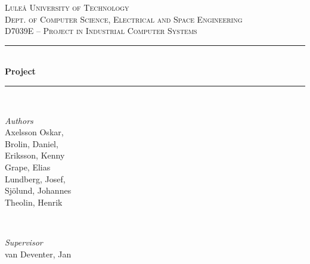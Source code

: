 \newcommand{\HRule}{\rule{\linewidth}{0.5mm}}
\center %


\textsc{\LARGE Luleå University of Technology}\\[1.5cm] %

\textsc{\Large Dept. of Computer Science, Electrical and Space Engineering}\\[0.5cm] %

\textsc{\large D7039E -- Project in Industrial Computer Systems}\\[0.5cm] %


\HRule\\[0.8cm]

{\huge\bfseries Project \project}\\[0.4cm] %

\HRule\\[1.5cm]

\begin{minipage}{0.4\textwidth}
	\begin{flushleft}
		\large
		\textit{Authors}\\
		Axelsson Oskar, \\ 
		Brolin, Daniel, \\ 
		Eriksson, Kenny \\ 
		Grape, Elias \\ 
		Lundberg, Josef, \\ 
		Sjölund, Johannes \\
		Theolin, Henrik
	\end{flushleft}
\end{minipage}
~
\begin{minipage}{0.4\textwidth}
	\begin{flushright}
		\large
		\textit{Supervisor}\\
		van Deventer, Jan
	\end{flushright}
\end{minipage}


